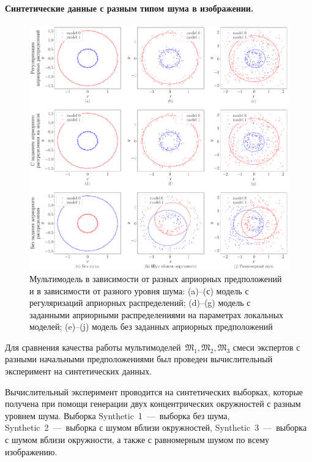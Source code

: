 \documentclass[12pt, twoside]{article}
\numberwithin{equation}{section}
\begin{document}
\paragraph{Синтетические данные с разным типом шума в изображении.}
\begin{figure}[h!t]\center
\includegraphics[width=1\textwidth]{result/experiment_synthetic}
\caption{Мультимодель в зависимости от разных априорных предположений и в зависимости от разного уровня шума: (a)--(с) модель с регуляризаций априорных распределений; (d)--(g) модель с заданными априорными распределениями на параметрах локальных моделей; (e)--(j) модель без заданных априорных предположений}
\label{experiment:1}
\end{figure}

Для сравнения качества работы мультимоделей~$\mathfrak{M}_1, \mathfrak{M}_2, \mathfrak{M}_3$ смеси экспертов с разными начальными предположениями был проведен вычислительный эксперимент на синтетических данных. 

Вычислительный эксперимент проводится на синтетических выборках, которые получена при помощи генерации двух концентрических окружностей с разным уровнем шума. Выборка Synthetic~1~---~выборка без шума, Synthetic~2~---~выборка с шумом вблизи окружностей, Synthetic~3~---~выборка с шумом вблизи окружности, а также с равномерным шумом по всему изображению.
\end{document}
